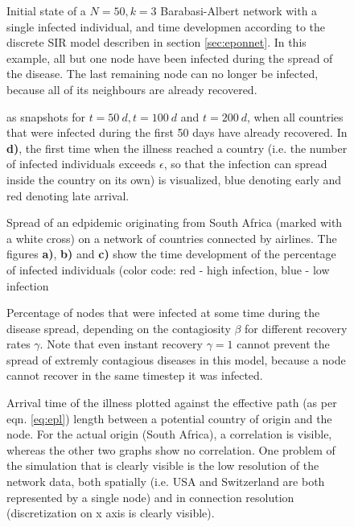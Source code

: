 \documentclass{scrartcl}
\begin{document}
\begin{figure}
    \centering
    \def\svgwidth{0.9\textwidth}
    
    \caption{Initial state of a $N=50, k=3$ Barabasi-Albert network with a single infected individual, and time developmen according to the discrete SIR model describen in section \ref{sec:eponnet}. In this example, all but one node have been infected during the spread of the disease. The last remaining node can no longer be infected, because all of its neighbours are already recovered.}
    \label{fig:D11}
\end{figure}


\begin{figure}
    \centering
    \def\svgwidth{1.0\textwidth}
    
    \caption{Spread of an edpidemic originating from South Africa (marked with a white cross) on a network of countries connected by airlines. The figures \textbf{a)}, \textbf{b)} and \textbf{c)} show the time development of the percentage of infected individuals (color code: red - high infection, blue - low infection} as snapshots for $t=\SI{50}{d}, t=\SI{100}{d}$ and $t=\SI{200}{d}$, when all countries that were infected during the first 50 days have already recovered.
		In \textbf{d)}, the first time when the illness reached a country (i.e. the number of infected individuals exceeds $\epsilon$, so that the infection can spread inside the country on its own) is visualized, blue denoting early and red denoting late arrival. 
    \label{fig:D1spread}
\end{figure}

\begin{figure}
    \centering
    \caption{Percentage of nodes that were infected at some time during the disease spread, 
		depending on the contagiosity $\beta$ for different recovery rates $\gamma$. Note that 
		even instant recovery $\gamma=1$ cannot prevent the spread of extremly contagious diseases
		in this model, because a node cannot recover in the same timestep it was infected.}
    \label{fig:D12}
\end{figure}

\begin{figure}
    \centering
    \caption{Arrival time of the illness plotted against the effective path (as per eqn. \ref{eq:epl}) length between 
		a potential country of origin and the node. For the actual origin (South Africa), a correlation is visible, whereas the other two graphs show no correlation. One problem of the simulation that is clearly visible is the low resolution of the network data, both spatially (i.e. USA and Switzerland are both represented by a single node) and in connection resolution (discretization on x axis is clearly visible).}
    \label{fig:arrival}
\end{figure}
\end{document}
